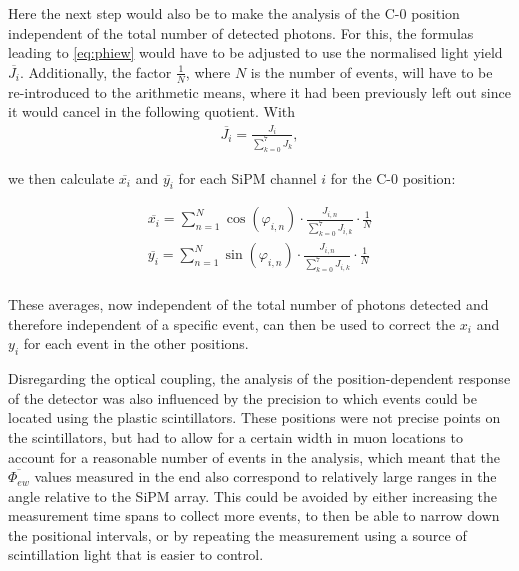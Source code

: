 	Here the next step would also be to make the analysis of the C-0 position independent of the total number of detected photons. For this, the formulas leading to \ref{eq:phiew} would have to be adjusted to use the normalised light yield $\overline{J_i}$. Additionally, the factor $\frac{1}{N}$, where $N$ is the number of events, will have to be re-introduced to the arithmetic means, where it had been previously left out since it would cancel in the following quotient. With
	\begin{align*}
		\overline{J_i} = \frac{J_i}{\sum_{k=0}^{7} J_k},
	\end{align*}
	
	we then calculate $\overline{x_i}$ and $\overline{y_i}$ for each \ac{SiPM} channel $i$ for the C-0 position:
	
	\begin{align*}
		\overline{x_i} = \sum_{n=1}^{N} \cos(\varphi_{i,n}) \cdot \frac{J_{i,n}}{\sum_{k=0}^{7} J_{i,k}} \cdot  \frac{1}{N} \\
		\overline{y_i} = \sum_{n=1}^{N} \sin(\varphi_{i,n}) \cdot \frac{J_{i,n}}{\sum_{k=0}^{7} J_{i,k}} \cdot \frac{1}{N} \\
	\end{align*}

	These averages, now independent of the total number of photons detected and therefore independent of a specific event, can then be used to correct the $x_i$ and $y_i$ for each event in the other positions.
	
	Disregarding the optical coupling, the analysis of the position-dependent response of the detector was also influenced by the precision to which events could be located using the plastic scintillators. %
	These positions were not precise points on the scintillators, but had to allow for a certain width in muon locations to account for a reasonable number of events in the analysis, which meant that the $\overline{\Phi_{ew}}$ values measured in the end also correspond to relatively large ranges in the angle relative to the \ac{SiPM} array. This could be avoided by either increasing the measurement time spans to collect more events, to then be able to narrow down the positional intervals, or by repeating the measurement using a source of scintillation light that is easier to control.
	
	
